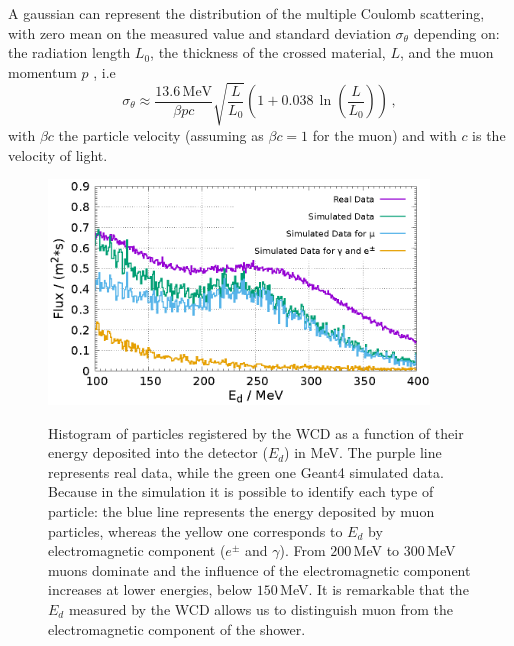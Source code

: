 \documentclass[letterpaper,10pt,titlepage,linenumber]{article}
\begin{document}
    A gaussian can represent the distribution of the multiple Coulomb scattering, with zero mean on the measured value and standard deviation $\sigma_{\theta}$ depending on: the radiation length $L_0$, the thickness of the crossed material, $L$,  and the muon momentum $p$  \cite{SchultzEtAl2004}, i.e 
\begin{equation}
\sigma_\theta \approx \frac{13.6 \, \text{MeV}}{\beta p c} \sqrt{\frac{L}{L_0}}\left( 1 + 0.038 \, \ln\left( \frac{L}{L_0} \right) \right) \, , 
\label{CoulombSigma}
\end{equation}
with $\beta c$ the particle velocity (assuming as $\beta c= 1$ for the muon) and with $c$ is the velocity of light.

\begin{figure}
\centering
{\includegraphics[width=0.9\textwidth]{Figures/mute-ch-hist-dataSimu.eps}}
	\caption{Histogram of particles registered by the WCD as
    a function of their energy deposited into the detector ($E_d$) in
    MeV. The purple line represents real data, while  
    the green one Geant4 simulated data. Because in the simulation it is possible to identify each type of particle: the blue line represents the energy deposited by muon particles, whereas the yellow one corresponds to $E_d$ by electromagnetic component ($e^{\pm}$ and $\gamma$). From  $200$\,MeV to $300$\,MeV muons dominate and the influence of the
    electromagnetic component increases at lower energies, below
    $150$\,MeV. It is remarkable that the $E_d$ measured by the
    WCD allows us to distinguish muon from the electromagnetic component of the shower.}
    
  \label{WDCEnergyLoss}
\end{figure}
\end{document}
